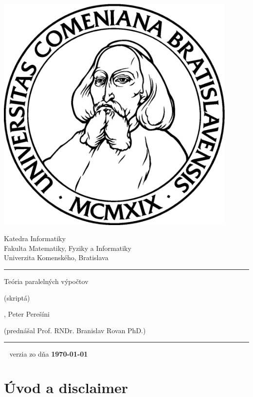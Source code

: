 \documentclass[a4paper]{report}
\title{\mytitle}
\def\mytitle{Teória paralelných výpočtov}
\begin{document}



\thispagestyle{empty}
\begin{minipage}{0.25\textwidth}
\includegraphics[width=0.9\textwidth]{img/komlogo-new}
\end{minipage}
\begin{minipage}{0.69\textwidth}
\begin{center}
\sc Katedra Informatiky \\
Fakulta Matematiky, Fyziky a Informatiky \\
Univerzita Komenského, Bratislava
\end{center}
\end{minipage}

\vfill
\begin{center}
\begin{minipage}{0.8\textwidth}
\hrule
\bigskip\bigskip
\centerline{\LARGE\sc \mytitle}
\smallskip
\centerline{(skriptá)}
\bigskip
\bigskip
\centerline{\large\sc {}, Peter Perešíni}
\bigskip
\centerline{\large\sc (prednášal Prof. RNDr. Branislav Rovan PhD.)}
\bigskip\bigskip
\hrule
\end{minipage}
\end{center}
\vfill
{~}
\hfill verzia zo dňa {\bf\today} 
\eject %

\section*{Úvod a disclaimer}
\end{document}
